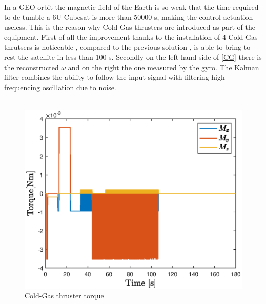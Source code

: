 \documentclass[11pt]{article}
\begin{document}
In a GEO orbit the magnetic field of the Earth is so weak that the time required to de-tumble a 6U Cubesat is more than 50000 s, making the control actuation useless. This is the reason why Cold-Gas thrusters are introduced as part of the equipment.
First of all the improvement thanks to the installation of 4 Cold-Gas thrutsers is noticeable , compared to the previous solution , is able to bring to rest the satellite in less than 100 s. Secondly on the left hand side of \ref{CG} there is the reconstructed $\omega$ and on the right the one measured by the gyro. The Kalman filter combines the ability to follow the input signal  with filtering high frequencing oscillation due to noise.\\\\
\begin{minipage}{.5 \textwidth}
\begin{figure} [H]
\centering 
\includegraphics[scale=0.6]{CGT.eps}
\caption{ Cold-Gas thruster torque}
\label{cgt}
\end{figure}
\end{minipage}
\end{document}
